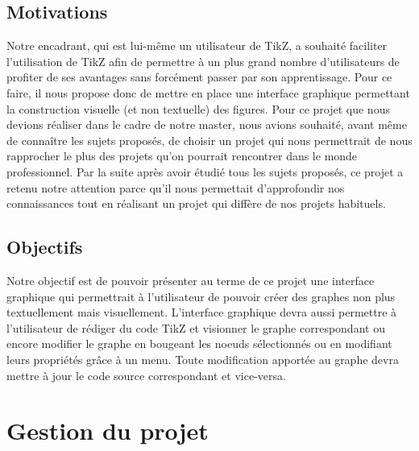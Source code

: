 \documentclass[a4paper]{report}
\begin{document}
  \subsection{Motivations}
  Notre encadrant, qui est lui-même un utilisateur de TikZ, a souhaité faciliter l'utilisation de TikZ afin de permettre à un plus grand nombre d'utilisateurs de profiter de ses avantages sans forcément passer par son apprentissage. Pour ce faire, il nous propose donc de mettre en place une interface graphique permettant la construction  visuelle (et non textuelle) des figures.
  \newline
  Pour ce projet que nous devions réaliser dans le cadre de notre master, nous avions souhaité, avant même de 
connaître les sujets proposés, de choisir un projet qui nous permettrait de nous rapprocher le plus des projets qu'on pourrait rencontrer dans le monde professionnel. Par la suite après avoir étudié tous les sujets proposés, ce projet a retenu notre attention parce qu'il nous permettait d'approfondir nos connaissances tout en réalisant un projet qui diffère de nos projets habituels.
  \subsection{Objectifs}
  Notre objectif est de pouvoir présenter au terme de ce projet une interface graphique qui permettrait à l'utilisateur de pouvoir créer des graphes non plus textuellement mais visuellement. L'interface graphique devra aussi permettre à l'utilisateur de rédiger du code TikZ et visionner le graphe correspondant ou encore modifier le graphe en bougeant les noeuds sélectionnés ou en modifiant leurs propriétés grâce à un menu.
Toute modification apportée au graphe devra mettre à jour le code source correspondant et vice-versa. 
  \section {Gestion du projet}
\end{document}
